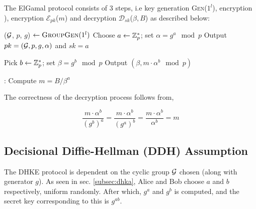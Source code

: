 The ElGamal protocol consists of 3 steps, i.e key generation \textsc{Gen}(\( 1^l \)), encryption \textsc), encryption \( \mathcal{E}_{pk}\)(\( m \)) and decryption \( \mathcal{D}_{sk} \)(\( \beta, B \)) as described below:

\smallskip


\begin{algorithmic}
\STATE ($ \mathcal{G} $, $ p $, $ g $) $ \leftarrow \textsc{GroupGen} (1^l) $ 
\STATE Choose $ a \leftarrow \mathbb{Z}^*_p $; set $ \alpha = g^a \mod p $ 
\STATE Output $ pk = ( \mathcal{G}, p, g, \alpha) $ and $ sk = a $ 
\end{algorithmic} 

\smallskip

\begin{algorithmic}
\STATE Pick $ b \leftarrow \mathbb{Z}^*_p $; set \( \beta = g^b \mod p \)  
\STATE Output $ ( \beta, m \cdot \alpha^b \mod p ) $ 
\end{algorithmic} 

\smallskip

\begin{algorithmic}
:
\STATE Compute $ m = B/\beta^a $ 
\end{algorithmic}

The correctness of the decryption process follows from,

\begin{equation*}
\frac{m \cdot \alpha^b}{(g^b)^a} = \frac{m \cdot \alpha^b}{(g^a)^b} = \frac{m \cdot \alpha^b}{\alpha^b} = m
\end{equation*}

\subsection{Decisional Diffie-Hellman (DDH) Assumption}

The DHKE protocol is dependent on the cyclic group \( \mathcal{G} \) chosen (along with generator \( g \)).
As seen in sec. \ref{subsec:dhka}, Alice and Bob choose \( a \) and \( b \) respectively, uniform randomly. 
After which, \( g^a \) and \( g^b \) is computed, and the secret key corresponding to this is \( g^{ab} \).

